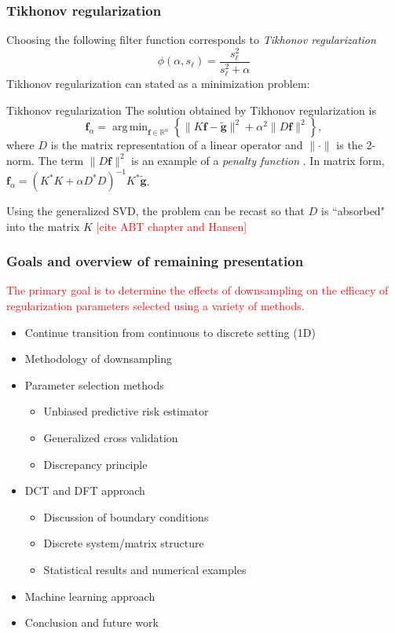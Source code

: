 \documentclass{beamer}
\newcommand{\ToDo}[1]{\textcolor{red}{[#1]}}
\newcommand{\gnoiseVec}{\widetilde{\mathbf{g}}}	%
\newcommand{\kMat}{K}	%
\newcommand{\fVec}{\mathbf{f}}	%
\newcommand{\ctrans}{*}	%
\newcommand{\singular}{s}	%
\newcommand{\regparam}{\alpha}
\newcommand{\regf}{\fVec_{\regparam}}	%
\DeclareMathOperator*{\argmin}{arg\,min}
\newcommand{\filt}{\phi}
\begin{document}
\begin{frame}
\frametitle{Tikhonov regularization}
Choosing the following filter function corresponds to \textit{Tikhonov regularization} \cite{Tikh1963}
\[\filt(\regparam,\singular_\ell) = \frac{\singular^2_\ell}{\singular^2_\ell + \regparam}\]
Tikhonov regularization can stated as a minimization problem:
\begin{block}{Tikhonov regularization}
The solution obtained by Tikhonov regularization is
\[\fVec_\regparam = \argmin_{\fVec\in\mathbb{R}^n} \left\{\|\kMat\fVec - \gnoiseVec\|^2 + \regparam^2\|D\fVec\|^2\right\},\]
where $D$ is the matrix representation of a linear operator and $\|\cdot\|$ is the 2-norm. The term $\|D\fVec\|^2$ is an example of a \textit{penalty function} \cite{Vogel:2002}. In matrix form, $\regf = (\kMat^\ctrans{\kMat} + \regparam{D^\ctrans}D)^{-1}\kMat^\ctrans\gnoiseVec$.
\end{block}
Using the generalized SVD, the problem can be recast so that $D$ is ``absorbed" into the matrix $\kMat$ \ToDo{cite ABT chapter and Hansen}
\end{frame}

\begin{frame}
\frametitle{Goals and overview of remaining presentation}
\textcolor{red}{The primary goal is to determine the effects of downsampling on the efficacy of regularization parameters selected using a variety of methods.} \\
\begin{itemize}
\item Continue transition from continuous to discrete setting (1D)
\item Methodology of downsampling
\item Parameter selection methods
\begin{itemize}
\item Unbiased predictive risk estimator
\item Generalized cross validation
\item Discrepancy principle
\end{itemize}
\item DCT and DFT approach
\begin{itemize}
\item Discussion of boundary conditions
\item Discrete system/matrix structure
\item Statistical results and numerical examples
\end{itemize}
\item Machine learning approach
\item Conclusion and future work
\end{itemize}
\end{frame}
\end{document}
